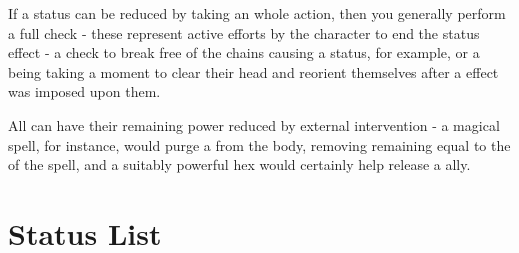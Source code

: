 If a status can be reduced by taking an whole action, then you generally perform a full  check - these represent active efforts by the character to end the status effect - a  check to break free of the chains causing a  status, for example, or a being taking a moment to clear their head and reorient themselves after a  effect was imposed upon them.

All  can have their remaining power reduced by external intervention - a magical  spell, for instance, would purge a  from the body, removing remaining   equal to the  of the spell, and a suitably powerful  hex would certainly help release a  ally. 


\section{Status List}

\newcommand\status[3]
{
	\subsubsection{#1}
	
	{\it #2}
	
	\begin{itemize}
	\renewcommand\labelitemi{\minus{}}
		#3
	\end{itemize}
}


